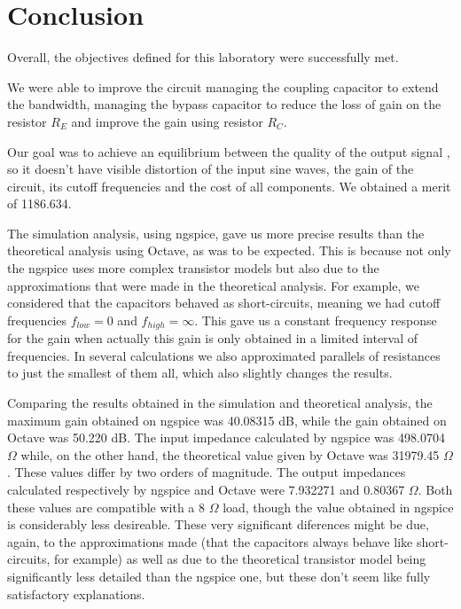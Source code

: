 \section{Conclusion}
\label{sec:conclusion}


Overall, the objectives defined for this laboratory were successfully met.

We were able to improve the circuit managing the coupling capacitor to extend the bandwidth, managing the bypass capacitor to reduce the loss of gain on the resistor $R_E$ and improve the gain using resistor $R_C$.

Our goal was to achieve an equilibrium between the quality of the output signal , so it doesn't have visible distortion of the input sine waves, the gain of the circuit, its cutoff frequencies and the cost of all components. We obtained a merit of 1186.634.

The simulation analysis, using ngspice, gave us more precise results than the theoretical analysis using Octave, as was to be expected. This is because not only the ngspice uses more complex transistor models but also due to the approximations that were made in the theoretical analysis. For example, we considered that the capacitors behaved as short-circuits, meaning we had cutoff frequencies $f_{low}=0$ and $f_{high}= \infty$. This gave us a constant frequency response for the gain when actually this gain is only obtained in a limited interval of frequencies.  In several calculations we also approximated parallels of resistances to just the smallest of them all, which also slightly changes the results.

Comparing the results obtained in the simulation and theoretical analysis, the maximum gain obtained on ngspice was 40.08315 dB, while the gain obtained on Octave was 50.220 dB. The input impedance calculated by ngspice was 498.0704 $\Omega$ while, on the other hand, the theoretical value  given by Octave was 31979.45 $\Omega$. These values differ by two orders of magnitude. The output impedances calculated respectively by ngspice and Octave were 7.932271 and 0.80367 $\Omega$. Both these values are compatible with a 8 $\Omega$ load, though the value obtained in ngspice is considerably less desireable. These very significant diferences might be due, again, to the approximations made (that the capacitors always behave like short-circuits, for example) as well as due to the theoretical transistor model being significantly less detailed than the ngspice one, but these don't seem like fully satisfactory explanations.



